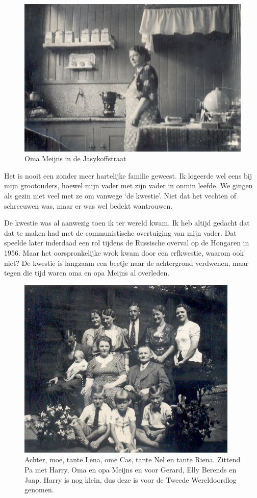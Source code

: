 \documentclass[12pt,twoside, openright]{memoir}
\begin{document}
\begin{figure}
\includegraphics[width=\textwidth]{img/ch1/omaJasykofstr}
\caption*{\footnotesize Oma Meijns in de Jasykoffstraat}
\end{figure}

Het is nooit een zonder meer hartelijke familie geweest. Ik logeerde wel eens bij mijn grootouders, hoewel mijn vader met zijn vader in onmin leefde. We gingen als gezin niet veel met ze om vanwege `de kwestie'. Niet dat het vechten of schreeuwen was, maar er was wel bedekt wantrouwen.

De kwestie was al aanwezig toen ik ter wereld kwam. Ik heb altijd gedacht dat dat te maken had met de communistische overtuiging van mijn vader. Dat speelde later inderdaad een rol tijdens de Russische overval op de Hongaren in 1956. Maar het oorspronkelijke wrok kwam door een erfkwestie, waarom ook niet? De kwestie is langzaam een beetje naar de achtergrond verdwenen, maar tegen die tijd waren oma en opa Meijns al overleden.

\begin{figure}[t]
\includegraphics[width=\textwidth]{img/ch1/famMeijns2}
\caption*{\footnotesize Achter, moe, tante Lena, ome Cas, tante Nel en tante Riena. Zittend Pa met Harry, Oma en opa Meijns en voor Gerard, Elly Berends en Jaap. Harry is nog klein, dus deze is voor de Tweede Wereldoordlog genomen.}
\end{figure}
\end{document}
